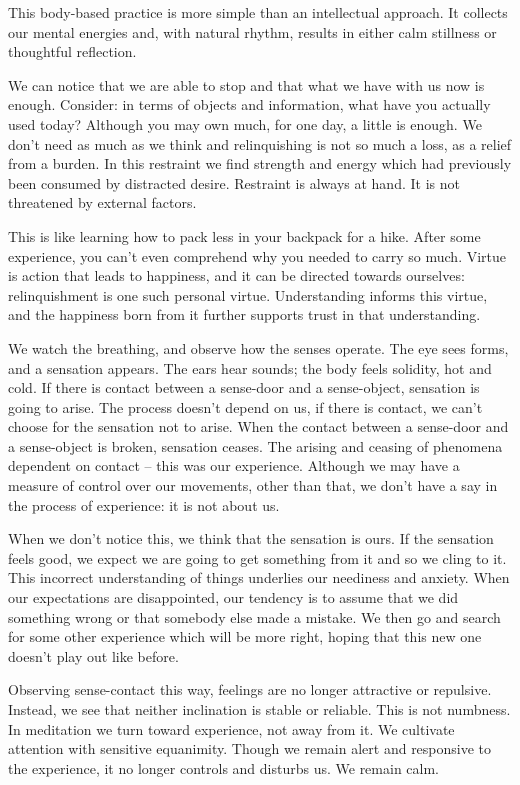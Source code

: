 This body-based practice is more simple than an intellectual approach.
It collects our mental energies and, with natural rhythm, results in
either calm stillness or thoughtful reflection.

We can notice that we are able to stop and that what we have with us now
is enough. Consider: in terms of objects and information, what have you
actually used today? Although you may own much, for one day, a little is
enough. We don't need as much as we think and relinquishing is not so
much a loss, as a relief from a burden. In this restraint we find
strength and energy which had previously been consumed by distracted
desire. Restraint is always at hand. It is not threatened by external
factors.

This is like learning how to pack less in your backpack for a hike.
After some experience, you can't even comprehend why you needed to carry
so much. Virtue is action that leads to happiness, and it can be
directed towards ourselves: relinquishment is one such personal virtue.
Understanding informs this virtue, and the happiness born from it
further supports trust in that understanding.


We watch the breathing, and observe how the senses operate. The eye sees
forms, and a sensation appears. The ears hear sounds; the body feels
solidity, hot and cold. If there is contact between a sense-door and a
sense-object, sensation is going to arise. The process doesn't depend on
us, if there is contact, we can't choose for the sensation not to arise.
When the contact between a sense-door and a sense-object is broken,
sensation ceases. The arising and ceasing of phenomena dependent on
contact -- this was our experience. Although we may have a measure of
control over our movements, other than that, we don't have a say in the
process of experience: it is not about us.

When we don't notice this, we think that the sensation is ours. If the
sensation feels good, we expect we are going to get something from it
and so we cling to it. This incorrect understanding of things underlies
our neediness and anxiety. When our expectations are disappointed, our
tendency is to assume that we did something wrong or that somebody else
made a mistake. We then go and search for some other experience which
will be more right, hoping that this new one doesn't play out like
before.

Observing sense-contact this way, feelings are no longer attractive or
repulsive. Instead, we see that neither inclination is stable or
reliable. This is not numbness. In meditation we turn toward experience,
not away from it. We cultivate attention with sensitive equanimity.
Though we remain alert and responsive to the experience, it no longer
controls and disturbs us. We remain calm.

